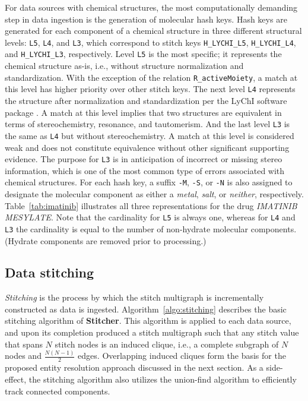 \documentclass{bioinfo}
\newcommand\st{\textbf{Stitcher}}
\begin{document}
\begin{methods}
For data sources with chemical structures, the most computationally
demanding step in data ingestion is the generation of molecular hash
keys. Hash keys are generated for each component of a chemical
structure in three different structural
levels: \texttt{L5}, \texttt{L4}, and \texttt{L3}, which correspond to
stitch keys \texttt{H\_LYCHI\_L5}, \texttt{H\_LYCHI\_L4},
and \texttt{H\_LYCHI\_L3}, respectively. Level \texttt{L5} is the most
specific; it represents the chemical structure as-is, i.e., without
structure normalization and standardization. With the exception of the
relation \texttt{R\_activeMoiety}, a match at this level has higher
priority over other stitch keys. The next level \texttt{L4} represents
the structure after normalization and standardization per the LyChI
software package \citep{lychi}. A match at this level implies that two
structures are equivalent 
in terms of stereochemistry, resonance, and tautomerism. And the last
level \texttt{L3} is the same as \texttt{L4} but without
stereochemistry. A match at this level is considered weak and does not
constitute equivalence without other significant supporting evidence.
The purpose for \texttt{L3} is in anticipation of incorrect or missing
stereo information, which is one of the most common type of errors
associated with chemical structures. For each hash key, a
suffix \texttt{-M}, \texttt{-S}, or \texttt{-N} is also assigned to
designate the molecular component as either
a \emph{metal}, \emph{salt}, or \emph{neither}, respectively.
Table~\ref{tab:imatinib} illustrates all three representations for the
drug \emph{IMATINIB MESYLATE}. Note that the cardinality
for \texttt{L5} is always one, whereas for \texttt{L4} and \texttt{L3}
the cardinality is equal to the number of non-hydrate molecular
components. (Hydrate components are removed prior to processing.) 

\subsection{Data stitching}
\emph{Stitching} is the process by which the stitch multigraph is
incrementally constructed as data is ingested.
Algorithm~\ref{algo:stitching} describes the basic stitching algorithm
of \st. This algorithm is applied to each data source, and upon its
completion produced a stitch multigraph such that any stitch value
that spans $N$ stitch nodes is an induced clique, i.e., a complete
subgraph of $N$ nodes and $\frac{N(N-1)}{2}$ edges. Overlapping
induced cliques form the basis for the proposed entity resolution
approach discussed in the next section. As a side-effect, the
stitching algorithm also utilizes the union-find
algorithm \citep{Cormen2001} to efficiently track connected
components. 


\end{methods}
\end{document}
